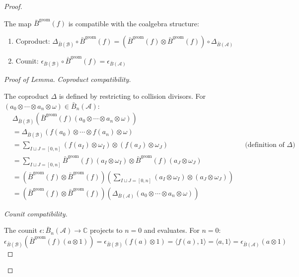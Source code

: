 \begin{proof}
\begin{lemma}\label{lem:bar-induced-coalgebra}
The map $\bar{B}^{\text{geom}}(f)$ is compatible with the coalgebra structure:
\begin{enumerate}
\item Coproduct: $\Delta_{\bar{B}(\mathcal{B})} \circ \bar{B}^{\text{geom}}(f) = (\bar{B}^{\text{geom}}(f) \otimes \bar{B}^{\text{geom}}(f)) \circ \Delta_{\bar{B}(\mathcal{A})}$
\item Counit: $\epsilon_{\bar{B}(\mathcal{B})} \circ \bar{B}^{\text{geom}}(f) = \epsilon_{\bar{B}(\mathcal{A})}$
\end{enumerate}
\end{lemma}

\begin{proof}[Proof of Lemma]
\emph{Coproduct compatibility.}

The coproduct $\Delta$ is defined by restricting to collision divisors. For $(a_0 \otimes \cdots \otimes a_n \otimes \omega) \in \bar{B}_n(\mathcal{A})$:
\begin{align*}
&\Delta_{\bar{B}(\mathcal{B})}(\bar{B}^{\text{geom}}(f)(a_0 \otimes \cdots \otimes a_n \otimes \omega)) \\
&= \Delta_{\bar{B}(\mathcal{B})}(f(a_0) \otimes \cdots \otimes f(a_n) \otimes \omega) \\
&= \sum_{I \sqcup J = [0,n]} (f(a_I) \otimes \omega_I) \otimes (f(a_J) \otimes \omega_J) && \text{(definition of } \Delta) \\
&= \sum_{I \sqcup J = [0,n]} \bar{B}^{\text{geom}}(f)(a_I \otimes \omega_I) \otimes \bar{B}^{\text{geom}}(f)(a_J \otimes \omega_J) \\
&= (\bar{B}^{\text{geom}}(f) \otimes \bar{B}^{\text{geom}}(f))\left(\sum_{I \sqcup J = [0,n]} (a_I \otimes \omega_I) \otimes (a_J \otimes \omega_J)\right) \\
&= (\bar{B}^{\text{geom}}(f) \otimes \bar{B}^{\text{geom}}(f))(\Delta_{\bar{B}(\mathcal{A})}(a_0 \otimes \cdots \otimes a_n \otimes \omega))
\end{align*}

\emph{Counit compatibility.}

The counit $\epsilon: \bar{B}_n(\mathcal{A}) \to \mathbb{C}$ projects to $n=0$ and evaluates. For $n=0$:
\[\epsilon_{\bar{B}(\mathcal{B})}(\bar{B}^{\text{geom}}(f)(a \otimes 1)) = \epsilon_{\bar{B}(\mathcal{B})}(f(a) \otimes 1) = \langle f(a), 1 \rangle = \langle a, 1 \rangle = \epsilon_{\bar{B}(\mathcal{A})}(a \otimes 1)\]


\end{proof}
\end{proof}
